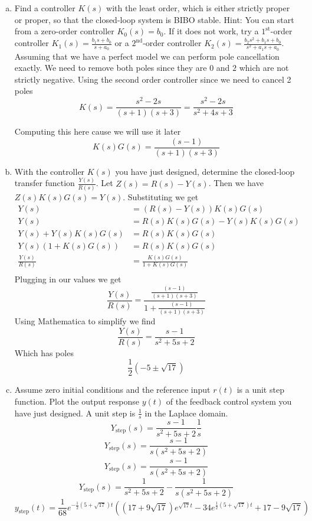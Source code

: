 \documentclass{article}
\begin{document}
\begin{enumerate}[(a)]
\item Find a controller $K(s)$ with the least order, which is either strictly proper or proper, so that the closed-loop system is BIBO stable.
Hint: You can start from a zero-order controller $K_0(s) = b_0$. If it does not work, try a $1^{\text{st}}$-order controller $ K_1(s) = \frac{b_1 s + b_0}{s+a_0}$ or a $2^{\text{nd}}$-order controller $K_2(s) = \frac{b_2 s^2 + b_1 s + b_0}{s^2 + a_1 s + a_0}$.
\newline
\newline
Assuming that we have a perfect model we can perform pole cancellation exactly.
We need to remove both poles since they are $0$ and $2$ which are not strictly negative.
\newline
Using the second order controller since we need to cancel 2 poles
$$ K(s) = \frac{s^2-2s}{(s+1)(s+3)} = \frac{s^2-2s}{s^2+4s+3} $$

Computing this here cause we will use it later
$$ K(s) G(s) = \frac{(s-1)}{(s+1)(s+3)} $$

\item With the controller $K(s)$ you have just designed, determine the closed-loop transfer function $\frac{Y(s)}{R(s)}$.
\newline
\newline
Let $Z(s) = R(s) - Y(s)$. Then we have $Z(s) K(s) G(s) = Y(s)$.
Substituting we get
\begin{align*}
Y(s) &= (R(s) - Y(s))K(s) G(s) \\
Y(s) &= R(s)K(s) G(s) - Y(s)K(s) G(s) \\
Y(s) + Y(s)K(s) G(s)  &= R(s)K(s) G(s) \\
Y(s)(1 + K(s) G(s))  &= R(s)K(s) G(s) \\
\frac{Y(s)}{R(s)}  &= \frac{K(s) G(s)}{1 + K(s) G(s)} \\
\end{align*}
Plugging in our values we get
$$ \frac{Y(s)}{R(s)} = \frac{\frac{(s-1)}{(s+1)(s+3)}}{1 + \frac{(s-1)}{(s+1)(s+3)}} $$
Using Mathematica to simplify we find
$$ \frac{Y(s)}{R(s)} = \frac{s-1}{s^2+5s + 2} $$
Which has poles
$$ \frac{1}{2}(-5 \pm \sqrt{17}) $$

\item Assume zero initial conditions and the reference input $r(t)$ is a unit step function.
Plot the output response $y(t)$ of the feedback control system you have just designed.
\newline
\newline
A unit step is $\frac{1}{s}$ in the Laplace domain.
$$ Y_{\text{step}}(s) = \frac{s-1}{s^2+5s + 2} \frac{1}{s} $$
$$ Y_{\text{step}}(s) = \frac{s-1}{s(s^2+5s + 2)} $$
$$ Y_{\text{step}}(s) = \frac{s-1}{s(s^2+5s + 2)} $$
$$ Y_{\text{step}}(s) = \frac{1}{s^2 + 5s + 2} - \frac{1}{s(s^2+5s+2)} $$
$$ y_{\text{step}}(t) = \frac{1}{68} e^{-\frac{1}{2} \left(5+\sqrt{17}\right) t} \left(\left(17+9 \sqrt{17}\right) e^{\sqrt{17} t}-34e^{\frac{1}{2} \left(5+\sqrt{17}\right) t}+17-9 \sqrt{17}\right) $$


\end{enumerate}
\end{document}
